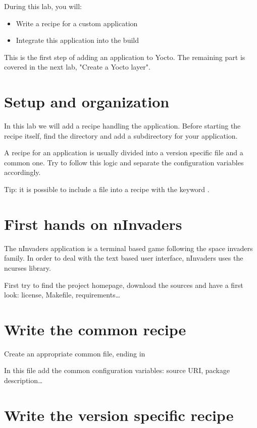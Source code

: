 
During this lab, you will:
\begin{itemize}
  \item Write a recipe for a custom application
  \item Integrate this application into the build
\end{itemize}

This is the first step of adding an application to Yocto. The
remaining part is covered in the next lab, "Create a Yocto layer".

\section{Setup and organization}

In this lab we will add a recipe handling the 
application. Before starting the recipe itself, find the
 directory and add a subdirectory for your
application.

A recipe for an application is usually divided into a version specific 
file and a common one. Try to follow this logic and separate the configuration
variables accordingly.

Tip: it is possible to include a file into a recipe with the keyword
.

\section{First hands on nInvaders}

The nInvaders application is a terminal based game following the space invaders
family. In order to deal with the text based user interface, nInvaders uses the
ncurses library.

First try to find the project homepage, download the sources and have a first
look: license, Makefile, requirements\dots

\section{Write the common recipe}

Create an appropriate common file, ending in 

In this file add the common configuration variables: source URI, package
description\dots

\section{Write the version specific recipe}

